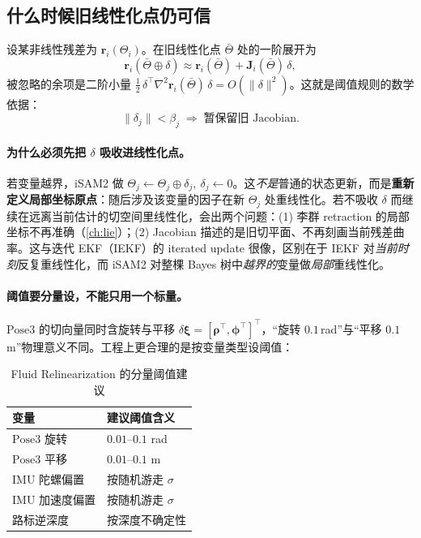 \subsection{什么时候旧线性化点仍可信}
\label{sec:isam-fluid-math}

设某非线性残差为 $\mathbf{r}_i(\Theta_i)$。在旧线性化点 $\bar\Theta$ 处的一阶展开为
\begin{equation}
  \mathbf{r}_i(\bar\Theta\oplus\delta)\approx\mathbf{r}_i(\bar\Theta)+\mathbf{J}_i(\bar\Theta)\,\delta,
  \label{eq:relin-taylor}
\end{equation}
被忽略的余项是二阶小量 $\tfrac12\,\delta^\top\nabla^2\mathbf{r}_i(\bar\Theta)\,\delta=O(\|\delta\|^2)$。这就是阈值规则的数学依据：
\begin{equation}
  \|\delta_j\|<\beta_j\;\Longrightarrow\;\text{暂保留旧 Jacobian}.
  \label{eq:relin-threshold}
\end{equation}

\paragraph{为什么必须先把 $\delta$ 吸收进线性化点。}
若变量越界，iSAM2 做 $\Theta_j\leftarrow\Theta_j\oplus\delta_j,\ \delta_j\leftarrow 0$。这\emph{不是}普通的状态更新，而是\textbf{重新定义局部坐标原点}：随后涉及该变量的因子在新 $\Theta_j$ 处重线性化。若不吸收 $\delta$ 而继续在远离当前估计的切空间里线性化，会出两个问题：(1) 李群 retraction 的局部坐标不再准确（\cref{ch:lie}）；(2) Jacobian 描述的是旧切平面、不再刻画当前残差曲率。这与迭代 EKF（IEKF）的 iterated update 很像，区别在于 IEKF 对\emph{当前时刻}反复重线性化，而 iSAM2 对整棵 Bayes 树中\emph{越界的}变量做\emph{局部}重线性化。

\paragraph{阈值要分量设，不能只用一个标量。}
$\mathrm{Pose3}$ 的切向量同时含旋转与平移 $\delta\boldsymbol{\xi}=[\boldsymbol{\rho}^\top,\boldsymbol{\phi}^\top]^\top$，“旋转 $0.1$\,rad”与“平移 $0.1$\,m”物理意义不同。工程上更合理的是按变量类型设阈值：

\begin{table}[H]\centering\small
\caption{Fluid Relinearization 的分量阈值建议}
\label{tab:relin-threshold}
\begin{tabular}{ll}
\toprule
变量 & 建议阈值含义 \\
\midrule
$\mathrm{Pose3}$ 旋转 & $0.01$--$0.1$ rad \\
$\mathrm{Pose3}$ 平移 & $0.01$--$0.1$ m \\
IMU 陀螺偏置 & 按随机游走 $\sigma$ \\
IMU 加速度偏置 & 按随机游走 $\sigma$ \\
路标逆深度 & 按深度不确定性 \\
\bottomrule
\end{tabular}
\end{table}

